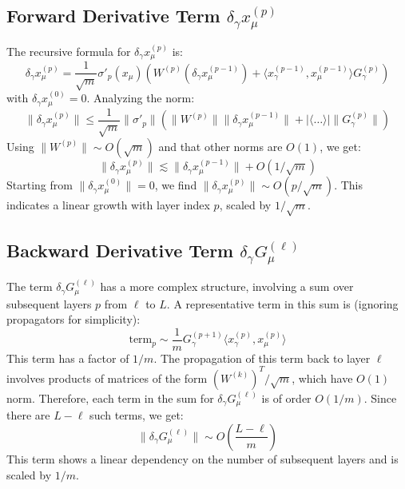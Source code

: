 \documentclass[11pt,a4paper]{article}
\begin{document}
\subsection{Forward Derivative Term $\delta_\gamma x^{(p)}_\mu$}

The recursive formula for $\delta_\gamma x^{(p)}_\mu$ is:
\begin{equation}
    \delta_\gamma x^{(p)}_\mu = \frac{1}{\sqrt{m}} \sigma'_{p}(x_\mu) \left( W^{(p)} (\delta_\gamma x^{(p-1)}_\mu) + \langle x^{(p-1)}_\gamma, x^{(p-1)}_\mu \rangle G^{(p)}_\gamma \right)
\end{equation}
with $\delta_\gamma x^{(0)}_\mu = 0$. Analyzing the norm:
\begin{equation}
    \|\delta_\gamma x^{(p)}_\mu\| \le \frac{1}{\sqrt{m}} \|\sigma'_{p}\| \left( \|W^{(p)}\| \|\delta_\gamma x^{(p-1)}_\mu\| + |\langle \dots \rangle| \|G^{(p)}_\gamma\| \right)
\end{equation}
Using $\|W^{(p)}\| \sim O(\sqrt{m})$ and that other norms are $O(1)$, we get:
\begin{equation}
    \|\delta_\gamma x^{(p)}_\mu\| \lesssim \|\delta_\gamma x^{(p-1)}_\mu\| + O(1/\sqrt{m})
\end{equation}
Starting from $\|\delta_\gamma x^{(0)}_\mu\| = 0$, we find $\|\delta_\gamma x^{(p)}_\mu\| \sim O(p/\sqrt{m})$. This indicates a linear growth with layer index $p$, scaled by $1/\sqrt{m}$.

\subsection{Backward Derivative Term $\delta_\gamma G^{(\ell)}_\mu$}

The term $\delta_\gamma G^{(\ell)}_\mu$ has a more complex structure, involving a sum over subsequent layers $p$ from $\ell$ to $L$. A representative term in this sum is (ignoring propagators for simplicity):
\begin{equation}
    \text{term}_p \sim \frac{1}{m} G^{(p+1)}_\gamma \langle x^{(p)}_\gamma, x^{(p)}_\mu \rangle
\end{equation}
This term has a factor of $1/m$. The propagation of this term back to layer $\ell$ involves products of matrices of the form $(W^{(k)})^T/\sqrt{m}$, which have $O(1)$ norm. Therefore, each term in the sum for $\delta_\gamma G^{(\ell)}_\mu$ is of order $O(1/m)$. Since there are $L-\ell$ such terms, we get:
\begin{equation}
    \|\delta_\gamma G^{(\ell)}_\mu\| \sim O\left(\frac{L-\ell}{m}\right)
\end{equation}
This term shows a linear dependency on the number of subsequent layers and is scaled by $1/m$.
\end{document}
